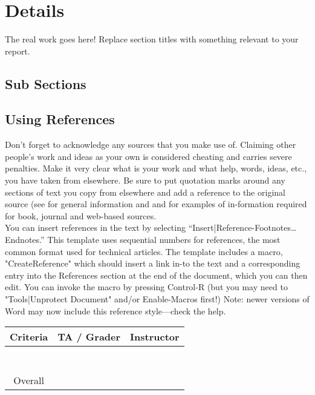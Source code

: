\documentclass[acmsmall,nonacm]{acmart}
\begin{document}
\section{Details}
The real work goes here! Replace section titles with something relevant to your report.

\subsection{Sub Sections}
\hfill

\subsection{Using References}

Don’t forget to acknowledge any sources that you make use of. Claiming other people's work and ideas as your own is considered cheating and carries severe penalties. 
Make it very clear what is your work and what help, words, ideas, etc., 
you have taken from elsewhere. Be sure to put quotation marks around any sections of text you copy from elsewhere and add a reference to the original source 
(see \cite{Davenport07} for general information and \cite{Davenport08} and \cite{Davenport09} for examples of in-formation required for book, journal and web-based sources.\\
You can insert references in the text by selecting “Insert|Reference-Footnotes… Endnotes.” 
This template uses sequential numbers for references, the most common format used for technical articles.
The template includes a macro, "CreateReference" which should insert a link in-to the text and a corresponding 
entry into the References section at the end of the document, which you can then edit. You can invoke the macro by pressing 
Control-R (but you may need to "Tools|Unprotect Document" and/or Enable-Macros first!) 
Note: newer versions of Word may now include this reference style—check the help.

\begin{table}[!b]
  \label{tab:freq}
  \begin{tabular}{ccl}
    \toprule
    Criteria&TA / Grader&Instructor\\
    \midrule
     & & \\
     & & \\
     & & \\
     & & \\
     & & \\
     & & \\
     & & \\
  \bottomrule
    Overall &&
\end{tabular}
\end{table}
\end{document}
